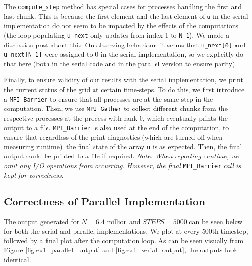 \documentclass[a4paper,10pt]{article}
\begin{document}
The \verb|compute_step| method has special cases for processes handling the first and last chunk. This is because the first element and the last element of \verb|u| in the serial implementation do not seem to be impacted by the effects of the computations (the loop populating \verb|u_next| only updates from index 1 to \verb|N-1|). We made a discussion post about this. On observing behaviour, it seems that \verb|u_next[0]| and \verb|u_next[N-1]| were assigned to 0 in the serial implementation, so we explicitly do that here (both in the serial code and in the parallel version to ensure parity). 

Finally, to ensure validity of our results with the serial implementation, we print the current status of the grid at certain time-steps. To do this, we first introduce a \verb|MPI_Barrier| to ensure that all processes are at the same step in the computation. Then, we use \verb|MPI_Gather| to collect different chunks from the respective processes at the process with rank 0, which eventually prints the output to a file. \verb|MPI_Barrier| is also used at the end of the computation, to ensure that regardless of the print diagnostics (which are turned off when measuring runtime), the final state of the array \verb|u| is as expected. Then, the final output could be printed to a file if required. \textit{Note: When reporting runtime, we omit any I/O operations from occurring. However, the final} \verb|MPI_Barrier| \textit{ call is kept for correctness}. 

\subsection{Correctness of Parallel Implementation}
The output generated for $N = 6.4\text{ million}$ and $STEPS = 5000$ can be seen below for both the serial and parallel implementations. We plot at every 500th timestep, followed by a final plot after the computation loop. As can be seen visually from Figure \ref{fig:ex1_parallel_output} and \ref{fig:ex1_serial_output}, the outputs look identical. 
\end{document}
